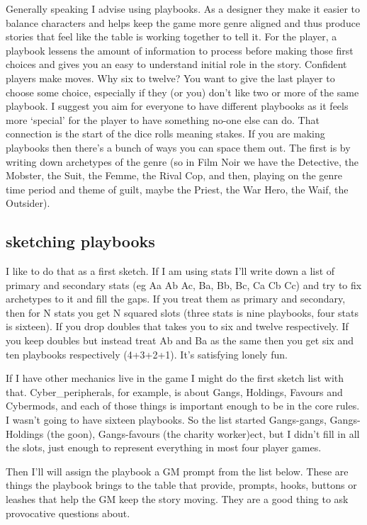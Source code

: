 \documentclass{tufte-handout}
\begin{document}
Generally speaking I advise using playbooks. As a designer they make it easier to balance characters and helps keep the game more genre aligned and thus produce stories that feel like the table is working together to tell it. For the player, a playbook lessens the amount of information to process before making those first choices and gives you an easy to understand initial role in the story. Confident players make moves.
Why six to twelve? You want to give the last player to choose some choice, especially if they (or you) don't like two or more of the same playbook. I suggest you aim for everyone to have different playbooks as it feels more `special' for the player to have something no-one else can do. That connection is the start of the dice rolls meaning stakes.
If you are making playbooks then there's a bunch of ways you can space them out.  The first is by writing down archetypes of the genre (so in Film Noir we have the Detective, the Mobster, the Suit, the Femme, the Rival Cop, and then, playing on the genre time period and theme of guilt, maybe the Priest, the War Hero, the Waif, the Outsider). 

\subsection{sketching playbooks}
I like to do that as a first sketch. If I am using stats I'll write down a list of primary and secondary stats (eg Aa Ab Ac, Ba, Bb, Bc, Ca Cb Cc) and try to fix archetypes to it and fill the gaps. If you treat them as primary and secondary, then for N stats you get N squared slots (three stats is nine playbooks, four stats is sixteen). If you drop doubles that takes you to six and twelve respectively. If you keep doubles but instead treat Ab and Ba as the same then you get six and ten playbooks respectively (4+3+2+1). It's satisfying lonely fun. 

If I have other mechanics live in the game I might do the first sketch list with that. Cyber\_peripherals, for example, is about Gangs, Holdings, Favours and Cybermods, and each of those things is important enough to be in the core rules. I wasn't going to have sixteen playbooks. So the list started Gangs-gangs, Gangs-Holdings (the goon), Gangs-favours (the charity worker)ect, but I didn't fill in all the slots, just enough to represent everything in most four player games.

Then I'll will assign the playbook a GM prompt from the list below. These are things the playbook brings to the table that provide, prompts, hooks, buttons or leashes that help the GM keep the story moving.  They are a good thing to ask provocative questions about.
\end{document}
